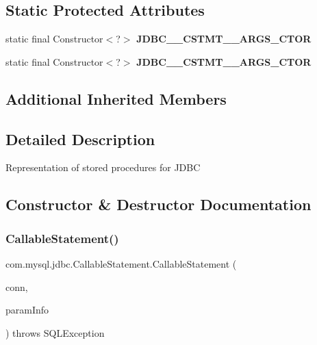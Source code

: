 \subsection*{Static Protected Attributes}
\begin{DoxyCompactItemize}
\item 
\mbox{\label{classcom_1_1mysql_1_1jdbc_1_1_callable_statement_a363eb79cdfabbbd54b1962cd54ca3b0f}} 
static final Constructor$<$?$>$ {\bfseries J\+D\+B\+C\+\_\+\_\+\+C\+S\+T\+M\+T\+\_\+\_\+\+A\+R\+G\+S\+\_\+\+C\+T\+OR}
\item 
\mbox{\label{classcom_1_1mysql_1_1jdbc_1_1_callable_statement_aad558da3f38195cd190f8cdb1cf1d876}} 
static final Constructor$<$?$>$ {\bfseries J\+D\+B\+C\+\_\+\_\+\+C\+S\+T\+M\+T\+\_\+\_\+\+A\+R\+G\+S\+\_\+\+C\+T\+OR}
\end{DoxyCompactItemize}
\subsection*{Additional Inherited Members}


\subsection{Detailed Description}
Representation of stored procedures for J\+D\+BC 

\subsection{Constructor \& Destructor Documentation}
\mbox{\label{classcom_1_1mysql_1_1jdbc_1_1_callable_statement_afe23a2502823ac5641c8541a642a5e82}} 
\subsubsection{\texorpdfstring{Callable\+Statement()}{CallableStatement()}\hspace{0.1cm}{\footnotesize\ttfamily [1/2]}}
{\footnotesize\ttfamily com.\+mysql.\+jdbc.\+Callable\+Statement.\+Callable\+Statement (\begin{DoxyParamCaption}\item[{\mbox{\hyperlink{interfacecom_1_1mysql_1_1jdbc_1_1_my_s_q_l_connection}{My\+S\+Q\+L\+Connection}}}]{conn,  }\item[{\mbox{\hyperlink{classcom_1_1mysql_1_1jdbc_1_1_callable_statement_1_1_callable_statement_param_info}{Callable\+Statement\+Param\+Info}}}]{param\+Info }\end{DoxyParamCaption}) throws S\+Q\+L\+Exception}

